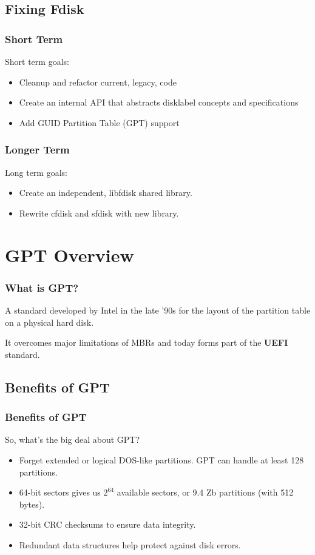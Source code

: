 \documentclass{beamer}
\begin{document}
\subsection{Fixing Fdisk}
\begin{frame}\frametitle{Short Term}
  Short term goals:
  \begin{itemize}
  \item Cleanup and refactor current, legacy, code
  \item Create an internal API that abstracts disklabel concepts and specifications
  \item Add GUID Partition Table (GPT) support
  \end{itemize}
\end{frame}

\begin{frame}\frametitle{Longer Term}
  Long term goals:
  \begin{itemize}
  \item Create an independent, libfdisk shared library.
  \item Rewrite cfdisk and sfdisk with new library.
  \end{itemize}
\end{frame}

\section{GPT Overview}
\begin{frame}\frametitle{What is GPT?}
  A standard developed by Intel in the late '90s for the layout of the partition table on a physical hard disk.\newline

  It overcomes major limitations of MBRs and today forms part of the \textbf{UEFI} standard.
\end{frame}

\subsection{Benefits of GPT}
\begin{frame}\frametitle{Benefits of GPT}
  So, what's the big deal about GPT?
  \begin{itemize}
  \item Forget extended or logical DOS-like partitions. GPT can handle at least 128 partitions.
  \item 64-bit sectors gives us $2^{64}$ available sectors, or 9.4 Zb partitions (with 512 bytes).
  \item 32-bit CRC checksums to ensure data integrity.
  \item Redundant data structures help protect against disk errors.
  \end{itemize}
\end{frame}
\end{document}
